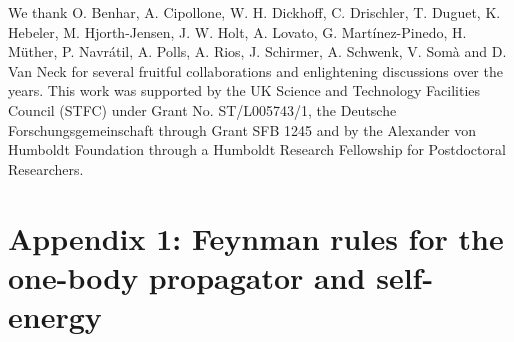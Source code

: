 

\begin{acknowledgement}
We thank O. Benhar, A. Cipollone, W. H. Dickhoff, C. Drischler, T. Duguet, K. Hebeler, M. Hjorth-Jensen, J. W. Holt, A. Lovato, G. Mart\'inez-Pinedo, H. M\"uther, P. Navr\'atil, A. Polls, A. Rios, J. Schirmer, A. Schwenk, V. Som\`a and D. Van Neck  for several fruitful collaborations and  enlightening discussions over the years.
%
This work was supported by the UK Science and Technology Facilities Council (STFC) under Grant No. ST/L005743/1, %
the  Deutsche Forschungsgemeinschaft through Grant SFB 1245
and by the Alexander von Humboldt Foundation through a Humboldt Research Fellowship for Postdoctoral Researchers.
\end{acknowledgement}
%

\section*{Appendix 1: Feynman rules for the one-body propagator and self-energy}
\label{app:Feyn_rules}


